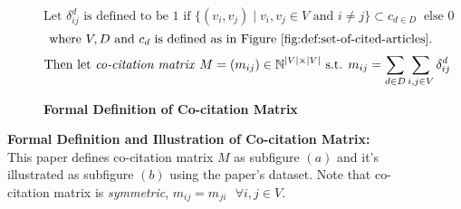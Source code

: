 \begin{figure}[]
    \begin{subfigure}[b]{1\textwidth}
        \[\text{Let } \delta^d_{ij} \text{ is defined to be } 1 \text{ if } \{(v_i, v_j) \mid v_i, v_j \in V \text{ and } i \neq j \} \subset c_{d \in D} \ \text{ else } 0\]
        \[\text{ where } V, D \text{ and } c_d \text{ is defined as in Figure \ref{fig:def:set-of-cited-articles}}. \]
        \[\text{Then let \textit{co-citation matrix} } M = (m_{ij}) \in \Bbb{N}^{|V| \times |V|} \text{ s.t. } m_{ij} = \sum_{d \in D}\sum_{i,j \in V}\delta^d_{ij}\]
        \caption{\textbf{Formal Definition of Co-citation Matrix}}
        \label{subfig:co-cites:def}
    \end{subfigure}
    \vfill
    \begin{subfigure}[b]{1\textwidth}
    \end{subfigure}
    \label{fig:def-illus-co-cites}      
    \caption{\textbf{Formal Definition and Illustration of Co-citation Matrix:} This paper defines co-citation matrix $M$ as subfigure $(a)$ and it's illustrated as subfigure $(b)$ using the paper's dataset. Note that co-citation matrix is \textit{symmetric}, $m_{ij} = m_{ji} \text{ } \forall i,j \in V$.} 
\end{figure}